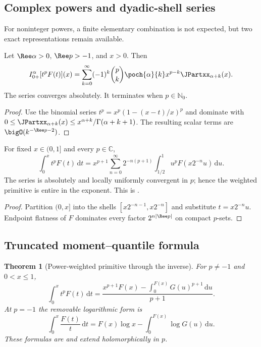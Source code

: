 \documentclass[11pt,oneside]{article}
\newtheorem{theorem}{Theorem}[section]
\theoremstyle{definition}
\theoremstyle{remark}
\newcommand{\C}{\mathbb C}
\newcommand{\N}{\mathbb N}
\newcommand{\dd}{\,\mathrm d}
\newcommand{\1}{\mathbf 1}
\begin{document}
\subsection{Complex powers and dyadic-shell series}

For noninteger powers, a finite elementary combination is not expected, but two exact
representations remain available.

\begin{proposition}
\label{p7:prop:complex-power-series}
Let $\Ree\alpha>0$, $\Ree p>-1$, and $x>0$.  Then
\begin{equation}
 I_{0+}^{\alpha}[t^pF(t)](x)
 =\sum_{k=0}^{\infty}(-1)^k\binom pk\poch{\alpha}{k}
 x^{p-k}\JPartxx_{\alpha+k}(x).
 \label{p7:eq:complex-power-series}
\end{equation}
The series converges absolutely.  It terminates when $p\in\N_0$.
\end{proposition}

\begin{proof}
Use the binomial series
$t^p=x^p(1-(x-t)/x)^p$ and dominate with
$0\le\JPartxx_{\alpha+k}(x)\le x^{\alpha+k}/\Gamma(\alpha+k+1)$.  The resulting scalar terms are
$\bigO(k^{-\Ree p-2})$.
\end{proof}

\begin{proposition}
\label{p7:prop:dyadic-shell}
For fixed $x\in(0,1]$ and every $p\in\C$,
\begin{equation}
 \int_0^xt^pF(t)\dd t
 =x^{p+1}\sum_{n=0}^{\infty}2^{-n(p+1)}
 \int_{1/2}^{1}u^pF(x2^{-n}u)\dd u.
 \label{p7:eq:dyadic-shell}
\end{equation}
The series is absolutely and locally uniformly convergent in $p$; hence the weighted
primitive is entire in the exponent.  This is \statusproved.
\end{proposition}

\begin{proof}
Partition $(0,x]$ into the shells
$[x2^{-n-1},x2^{-n}]$ and substitute $t=x2^{-n}u$.  Endpoint flatness of $F$ dominates every
factor $2^{n|\Ree p|}$ on compact $p$-sets.
\end{proof}

\subsection{Truncated moment--quantile formula}

\begin{theorem}[Power-weighted primitive through the inverse]
\label{p7:thm:truncated-quantile}
For $p\ne-1$ and $0<x\le1$,
\begin{equation}
 \int_0^xt^pF(t)\dd t
 =\frac{x^{p+1}F(x)-\displaystyle\int_0^{F(x)}G(u)^{p+1}\dd u}{p+1}.
 \label{p7:eq:truncated-quantile}
\end{equation}
At $p=-1$ the removable logarithmic form is
\begin{equation}
 \int_0^x\frac{F(t)}t\dd t
 =F(x)\log x-\int_0^{F(x)}\log G(u)\dd u.
 \label{p7:eq:log-weight-F}
\end{equation}
These formulas are \statusproved{} and extend holomorphically in $p$.
\end{theorem}
\end{document}
